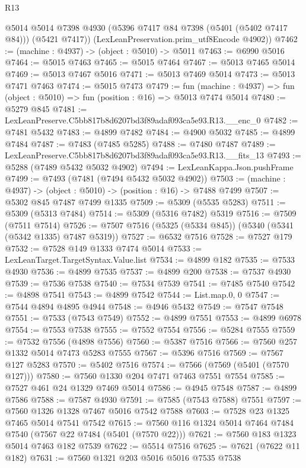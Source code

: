 \begin{lexlean}{R13}
\begin{coremodule}
        @5014
        @5014
        @7398
        @4930
        (@5396 @7417 @84 @7398 (@5401 (@5402 @7417 @84)))
        (@5421 @7417))
      (LexLeanPreservation.prim_utf8Encode @4902))
@7462 := (machine : @4937) -> (object : @5010) -> @5011
@7463 := @6990 @5016
@7464 := @5015 @7463
@7465 := @5015 @7464
@7467 := @5013 @7465 @5014
@7469 := @5013 @7467 @5016
@7471 := @5013 @7469 @5014
@7473 := @5013 @7471 @7463
@7474 := @5015 @7473
@7479 := fun (machine : @4937) => fun (object : @5010) => fun (position : @16) => @5013 @7474 @5014
@7480 := @5279 @845
@7481 := LexLeanPreserve.C5bb817b8d6207bd3f89adaf093ca5e93.R13.__enc_0
@7482 := @7481 @5432
@7483 := @4899 @7482
@7484 := @4900 @5032
@7485 := @4899 @7484
@7487 := @7483 (@7485 @5285)
@7488 := @7480 @7487
@7489 := LexLeanPreserve.C5bb817b8d6207bd3f89adaf093ca5e93.R13.__fits_13
@7493 := @5288 (@7489 @5432 @5032 @4902)
@7494 := LexLeanKappa.Json.pushFrame
@7499 := @7493 (@7481 (@7494 @5432 @5032 @4902))
@7503 := (machine : @4937) -> (object : @5010) -> (position : @16) -> @7488 @7499
@7507 := @5302 @845 @7487 @7499 @1335
@7509 := @5309 (@5535 @5283)
@7511 := @5309 (@5313 @7484)
@7514 := @5309 (@5316 @7482) @5319
@7516 := @7509 (@7511 @7514)
@7526 := @7507 @7516 (@5325 (@5334 @845)) (@5340 (@5341 (@5342 @1335) @7487 @5319))
@7527 := @6532 @7516
@7528 := @7527 @179
@7532 := @7528 @149 @1333 @7474 @5014
@7533 := LexLeanTarget.TargetSyntax.Value.list
@7534 := @4899 @182
@7535 := @7533 @4930
@7536 := @4899 @7535
@7537 := @4899 @200
@7538 := @7537 @4930
@7539 := @7536 @7538
@7540 := @7534 @7539
@7541 := @7485 @7540
@7542 := @4898 @7541
@7543 := @4899 @7542
@7544 := List.map.{0, 0}
@7547 := @7544 @4894 @4895 @4944
@7548 := @4946 @5432
@7549 := @7547 @7548
@7551 := @7533 (@7543 @7549)
@7552 := @4899 @7551
@7553 := @4899 @6978
@7554 := @7553 @7538
@7555 := @7552 @7554
@7556 := @5284 @7555
@7559 := @7532 @7556 (@4898 @7556)
@7560 := @5387 @7516
@7566 := @7560 @257 @1332 @5014 @7473 @5283 @7555
@7567 := @5396 @7516
@7569 := @7567 @127 @5283
@7570 := @5402 @7516
@7574 := @7566 (@7569 (@5401 (@7570 @127)))
@7580 := @7560 @1330 @204 @7471 @7463 @7551 @7554
@7585 := @7527 @461 @24 @1329 @7469 @5014
@7586 := @4945 @7548
@7587 := @4899 @7586
@7588 := @7587 @4930
@7591 := @7585 (@7543 @7588) @7551
@7597 := @7560 @1326 @1328 @7467 @5016 @7542 @7588
@7603 := @7528 @23 @1325 @7465 @5014 @7541 @7542
@7615 := @7560 @116 @1324 @5014 @7464 @7484 @7540 (@7567 @22 @7484 (@5401 (@7570 @22)))
@7621 := @7560 @183 @1323 @5014 @7463 @182 @7539
@7622 := @5514 @7516
@7625 := @7621 (@7622 @11 @182)
@7631 := @7560 @1321 @203 @5016 @5016 @7535 @7538

\end{coremodule}
\end{lexlean}

